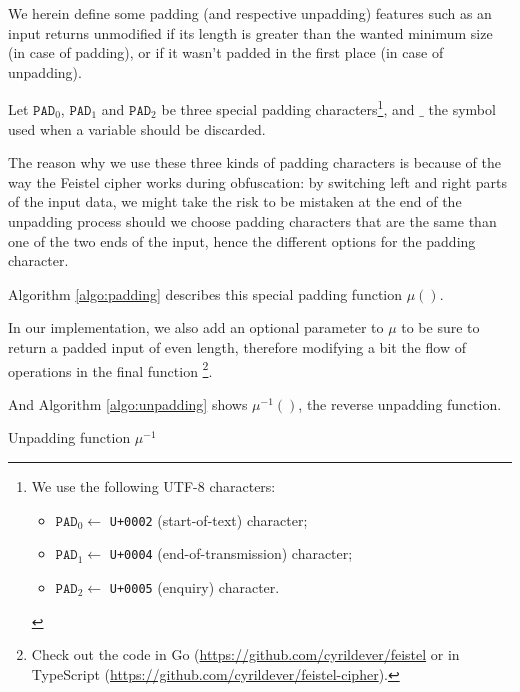 \documentclass[twoside,twocolumn]{article}
\theoremstyle{definition}
\theoremstyle{remark}
\begin{document}
We herein define some padding (and respective unpadding) features such as an input returns unmodified if its length is greater than the wanted minimum 
size (in case of padding), or if it wasn't padded in the first place (in case of unpadding).

Let $\texttt{PAD}_0$, $\texttt{PAD}_1$ and $\texttt{PAD}_2$ be three special padding characters\footnote{We use the following UTF-8 characters:
\begin{itemize}
    \item $\texttt{PAD}_0 \gets$ \texttt{U+0002} (start-of-text) character;
    \item $\texttt{PAD}_1 \gets$ \texttt{U+0004} (end-of-transmission) character;
    \item $\texttt{PAD}_2 \gets$ \texttt{U+0005} (enquiry) character.
\end{itemize}}, and $\_$ the symbol used when a variable should be discarded.

The reason why we use these three kinds of padding characters is because of the way the Feistel cipher works during obfuscation: by switching left and 
right parts of the input data, we might take the risk to be mistaken at the end of the unpadding process should we choose padding characters that are the 
same than one of the two ends of the input, hence the different options for the padding character.

Algorithm \ref{algo:padding} describes this special padding function $\mu()$.

In our implementation, we also add an optional parameter to $\mu$ to be sure to return a padded input of even length, therefore modifying a bit 
the flow of operations in the final function \footnote{Check out the code in Go (\url{https://github.com/cyrildever/feistel} or in TypeScript  
(\url{https://github.com/cyrildever/feistel-cipher}).}.

And Algorithm \ref{algo:unpadding} shows $\mu^{-1}()$, the reverse unpadding function.

\begin{algorithm}
    \caption{Unpadding function $\mu^{-1}$}
    \label{algo:unpadding}
\end{algorithm}
\end{document}
